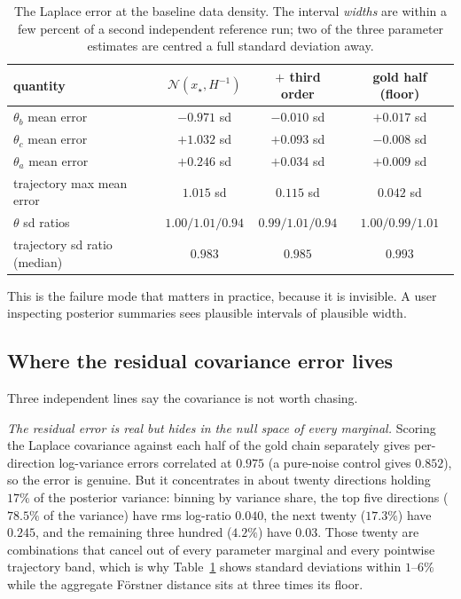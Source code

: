 \documentclass[11pt]{article}
\newcommand{\xmap}{x_{\star}}
\theoremstyle{plain}
\theoremstyle{definition}
\theoremstyle{remark}
\begin{document}
\begin{table}[t]
\centering
\small
\begin{tabular}{lccc}
\toprule
quantity & $\mathcal{N}(\xmap,H^{-1})$ & $+$ third order & gold half (floor) \\
\midrule
$\theta_b$ mean error      & $\mathbf{-0.971}$ sd & $-0.010$ sd & $+0.017$ sd \\
$\theta_c$ mean error      & $\mathbf{+1.032}$ sd & $+0.093$ sd & $-0.008$ sd \\
$\theta_a$ mean error      & $+0.246$ sd & $+0.034$ sd & $+0.009$ sd \\
trajectory max mean error  & $1.015$ sd  & $0.115$ sd  & $0.042$ sd \\[2pt]
$\theta$ sd ratios         & $1.00/1.01/0.94$ & $0.99/1.01/0.94$ & $1.00/0.99/1.01$ \\
trajectory sd ratio (median) & $0.983$ & $0.985$ & $0.993$ \\
\bottomrule
\end{tabular}
\caption{The Laplace error at the baseline data density. The interval \emph{widths} are within a
few percent of a second independent reference run; two of the three parameter estimates are
centred a full standard deviation away.}
\label{tab:diagnosis}
\end{table}

This is the failure mode that matters in practice, because it is invisible. A user inspecting
posterior summaries sees plausible intervals of plausible width.

\subsection{Where the residual covariance error lives}

Three independent lines say the covariance is not worth chasing.

\emph{The residual error is real but hides in the null space of every marginal.} Scoring the
Laplace covariance against each half of the gold chain separately gives per-direction
log-variance errors correlated at $0.975$ (a pure-noise control gives $0.852$), so the error is
genuine. But it concentrates in about twenty directions holding $17\%$ of the posterior variance:
binning by variance share, the top five directions ($78.5\%$ of the variance) have rms log-ratio
$0.040$, the next twenty ($17.3\%$) have $0.245$, and the remaining three hundred ($4.2\%$) have
$0.03$. Those twenty are combinations that cancel out of every parameter marginal and every
pointwise trajectory band, which is why Table~\ref{tab:diagnosis} shows standard deviations within
$1$--$6\%$ while the aggregate F\"orstner distance sits at three times its floor.
\end{document}
